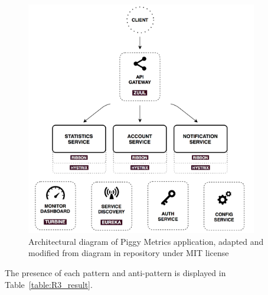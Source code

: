\documentclass{Configuration_Files/PoliMi3i_thesis}
\begin{document}
\begin{figure}[H]
\centering
\includegraphics[width=0.9\textwidth]{myImages/R3.png}
\caption{Architectural diagram of Piggy Metrics application, adapted and modified from diagram in repository under MIT license}
\label{fig:R3_arch}
\end{figure}

The presence of each pattern and anti-pattern is displayed in Table~\ref{table:R3_result}.
\end{document}
